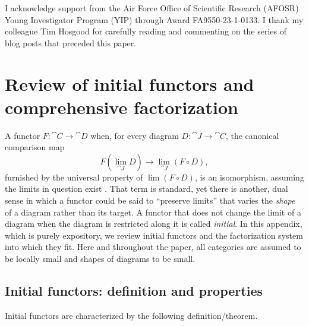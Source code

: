 \documentclass[11pt]{article}
\numberwithin{equation}{section}
\begin{document}
I acknowledge support from the Air Force Office of Scientific Research (AFOSR)
Young Investigator Program (YIP) through Award FA9550-23-1-0133. I thank my
colleague Tim Hosgood for carefully reading and commenting on the series of blog
posts that preceded this paper.

\printbibliography[heading=bibintoc]

\appendix
{}

\section{Review of initial functors and comprehensive factorization}
\label{sec:initial-functors}

A functor $F: \cat{C} \to \cat{D}$  when, for every
diagram $D: \cat{J} \to \cat{C}$, the canonical comparison map
\begin{equation*}
  \textstyle F(\lim_{\cat{J}} D) \to \lim_{\cat{J}} (F \circ D),
\end{equation*}
furnished by the universal property of $\lim(F \circ D)$, is an isomorphism,
assuming the limits in question exist \cite[\mbox{Exercise V.4.5}]{maclane1998}.
That term is standard, yet there is another, dual sense in which a functor could
be said to ``preserve limits'' that varies the \emph{shape} of a diagram rather
than its target. A functor that does not change the limit of a diagram when the
diagram is restricted along it is called \emph{initial}. In this appendix, which
is purely expository, we review initial functors and the factorization system
into which they fit. Here and throughout the paper, all categories are assumed
to be locally small and shapes of diagrams to be small.

\subsection{Initial functors: definition and properties}

Initial functors are characterized by the following definition/theorem.
\end{document}
